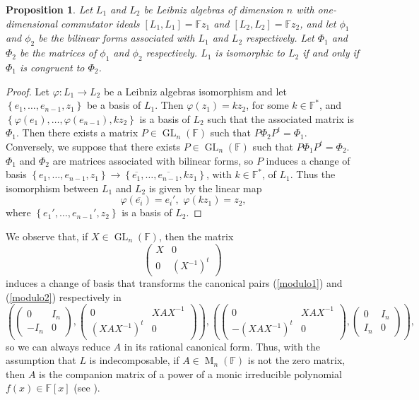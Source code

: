\documentclass[english,4paper,10pt]{article}
\newcommand{\F}{\mathbb{F}}
\newtheorem{prop}[thm]{Proposition}
\begin{document}
\begin{prop}
	Let $L_1$ and $L_2$ be Leibniz algebras of dimension $n$ with one-dimensional commutator ideals $\left[L_1,L_1\right]=\mathbb{F}z_1$ and $\left[L_2,L_2\right]=\mathbb{F}z_2$, and let $\phi_1$ and $\phi_2$ be the bilinear forms associated with $L_1$ and $L_2$ respectively. Let $\Phi_1$ and $\Phi_2$ be the matrices of $\phi_1$ and $\phi_2$ respectively. $L_1$ is isomorphic to $L_2$ if and only if $\Phi_1$ is congruent to $\Phi_2$.
\end{prop}
\begin{proof}
	Let $\varphi \colon L_1\rightarrow L_2$ be a Leibniz algebras isomorphism and let $\left\{e_1,\ldots,e_{n-1},z_1\right\}$ be a basis of $L_1$. Then $\varphi(z_1)=kz_2$, for some $k \in \mathbb{F}^*$, and $\left\{\varphi(e_1),\ldots,\varphi(e_{n-1}),kz_2\right\}$ is a basis of $L_2$ such that the associated matrix is $\Phi_1$. Then there exists a matrix $P\in \operatorname{GL}_n(\F)$ such that $P\Phi_2 P^t=\Phi_1$.\\
	Conversely, we suppose that there exists $P\in \operatorname{GL}_n(\F)$ such that $P\Phi_1 P^t=\Phi_2$. $\Phi_1$ and $\Phi_2$ are matrices associated with bilinear forms, so $P$ induces a change of basis $\left\{e_1,\ldots,e_{n-1},z_1\right\}\rightarrow\left\{\overline{e_1},\ldots,\overline{e_{n-1}},kz_1\right\}$, with $k \in \mathbb{F}^*$, of $L_1$. Thus the isomorphism between $L_1$ and $L_2$ is given by the linear map 
	$$
	\varphi(\overline{e_i})=e_i',\,\, \varphi(kz_1)=z_2, 
	$$
	where $\left\{e_1',\ldots,e_{n-1}',z_2\right\}$ is a basis of $L_2$.
\end{proof}
We observe that, if $X\in \operatorname{GL}_n(\F)$, then the matrix
$$
\begin{pmatrix}
	X & 0 \\
	0 & \left(X^{-1}\right)^t
\end{pmatrix}\
$$
 induces a change of basis that transforms the canonical pairs (\ref{modulo1}) and (\ref{modulo2}) respectively in
\begin{equation*}
 \left(\begin{pmatrix}
	0 & I_n \\ -I_n & 0
\end{pmatrix},
\begin{pmatrix}
	0 & XAX^{-1} \\ \left(XAX^{-1}\right)^t & 0  
\end{pmatrix}\right),
\left(\begin{pmatrix}
0 & XAX^{-1} \\ -\left(XAX^{-1}\right)^t & 0 
\end{pmatrix},
\begin{pmatrix}
	 	0 & I_n \\ I_n & 0
\end{pmatrix}\right),
\end{equation*}
so we can always reduce $A$ in its rational canonical form. Thus, with the assumption that $L$ is indecomposable, if $A\in \operatorname{M}_n(\F)$ is not the zero matrix, then $A$ is the companion matrix of a power of a monic irreducible polynomial $f(x)\in\F\left[x\right]$ (see \cite{jacobson2012basic}).
\end{document}
